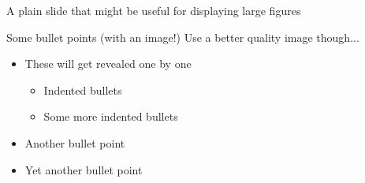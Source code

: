 \documentclass[aspectratio=169]{beamer}
\begin{document}
\begin{frame}[plain]
  A plain slide that might be useful for displaying large figures
\end{frame}

\begin{frame}[div=0.675\paperwidth]{Some bullet points (with an image!)}
  Use a better quality image though...
  \begin{itemize}[<+->]
  \item These will get revealed one by one
    \begin{itemize}
    \item Indented bullets
    \item Some more indented bullets
    \end{itemize}
  \item Another bullet point
  \item Yet another bullet point
  \end{itemize}
\end{frame}
\end{document}
